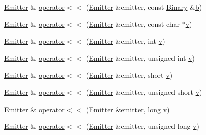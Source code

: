 \begin{DoxyCompactItemize}
\mbox{\hyperlink{class_y_a_m_l_1_1_emitter}{Emitter}} \& \mbox{\hyperlink{namespace_y_a_m_l_aadf091e7c1f0e1be6e7f74e453a51dc4}{operator$<$$<$}} (\mbox{\hyperlink{class_y_a_m_l_1_1_emitter}{Emitter}} \&emitter, const \mbox{\hyperlink{class_y_a_m_l_1_1_binary}{Binary}} \&\mbox{\hyperlink{glad_8h_a6eba317e3cf44d6d26c04a5a8f197dcb}{b}})
\item 
\mbox{\hyperlink{class_y_a_m_l_1_1_emitter}{Emitter}} \& \mbox{\hyperlink{namespace_y_a_m_l_aafd6b671140088225a840a365d62906e}{operator$<$$<$}} (\mbox{\hyperlink{class_y_a_m_l_1_1_emitter}{Emitter}} \&emitter, const char $\ast$\mbox{\hyperlink{glad_8h_a14cfbe2fc2234f5504618905b69d1e06}{v}})
\item 
\mbox{\hyperlink{class_y_a_m_l_1_1_emitter}{Emitter}} \& \mbox{\hyperlink{namespace_y_a_m_l_ad478aa51ef7f3841147a53b93f40fd0c}{operator$<$$<$}} (\mbox{\hyperlink{class_y_a_m_l_1_1_emitter}{Emitter}} \&emitter, int \mbox{\hyperlink{glad_8h_a14cfbe2fc2234f5504618905b69d1e06}{v}})
\item 
\mbox{\hyperlink{class_y_a_m_l_1_1_emitter}{Emitter}} \& \mbox{\hyperlink{namespace_y_a_m_l_aa3e4bc35bc3a86babb6f670cd0c3a9d0}{operator$<$$<$}} (\mbox{\hyperlink{class_y_a_m_l_1_1_emitter}{Emitter}} \&emitter, unsigned int \mbox{\hyperlink{glad_8h_a14cfbe2fc2234f5504618905b69d1e06}{v}})
\item 
\mbox{\hyperlink{class_y_a_m_l_1_1_emitter}{Emitter}} \& \mbox{\hyperlink{namespace_y_a_m_l_afa9c23df6838345ded374e254ea67532}{operator$<$$<$}} (\mbox{\hyperlink{class_y_a_m_l_1_1_emitter}{Emitter}} \&emitter, short \mbox{\hyperlink{glad_8h_a14cfbe2fc2234f5504618905b69d1e06}{v}})
\item 
\mbox{\hyperlink{class_y_a_m_l_1_1_emitter}{Emitter}} \& \mbox{\hyperlink{namespace_y_a_m_l_a1e68113bc51e4a43118b20f203b0c165}{operator$<$$<$}} (\mbox{\hyperlink{class_y_a_m_l_1_1_emitter}{Emitter}} \&emitter, unsigned short \mbox{\hyperlink{glad_8h_a14cfbe2fc2234f5504618905b69d1e06}{v}})
\item 
\mbox{\hyperlink{class_y_a_m_l_1_1_emitter}{Emitter}} \& \mbox{\hyperlink{namespace_y_a_m_l_a5a806c7b075726b0fd98d41da23c8c52}{operator$<$$<$}} (\mbox{\hyperlink{class_y_a_m_l_1_1_emitter}{Emitter}} \&emitter, long \mbox{\hyperlink{glad_8h_a14cfbe2fc2234f5504618905b69d1e06}{v}})
\item 
\mbox{\hyperlink{class_y_a_m_l_1_1_emitter}{Emitter}} \& \mbox{\hyperlink{namespace_y_a_m_l_a04607f25a393772530e117f6c6fca15d}{operator$<$$<$}} (\mbox{\hyperlink{class_y_a_m_l_1_1_emitter}{Emitter}} \&emitter, unsigned long \mbox{\hyperlink{glad_8h_a14cfbe2fc2234f5504618905b69d1e06}{v}})

\end{DoxyCompactItemize}
